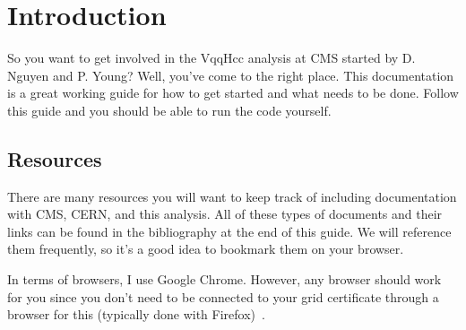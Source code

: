 \chapter{Introduction}\label{ch:intro}

So you want to get involved in the VqqHcc analysis at CMS started by D. Nguyen and P. Young? Well, you've come to the right place. This documentation is a great working guide for how to get started and what needs to be done. Follow this guide and you should be able to run the code yourself.

\section{Resources}
There are many resources you will want to keep track of including documentation with CMS, CERN, and this analysis. All of these types of documents and their links can be found in the bibliography at the end of this guide. We will reference them frequently, so it's a good idea to bookmark them on your browser.

In terms of browsers, I use Google Chrome. However, any browser should work for you since you don't need to be connected to your grid certificate through a browser for this (typically done with Firefox)~\cite{cms_getting_started}.